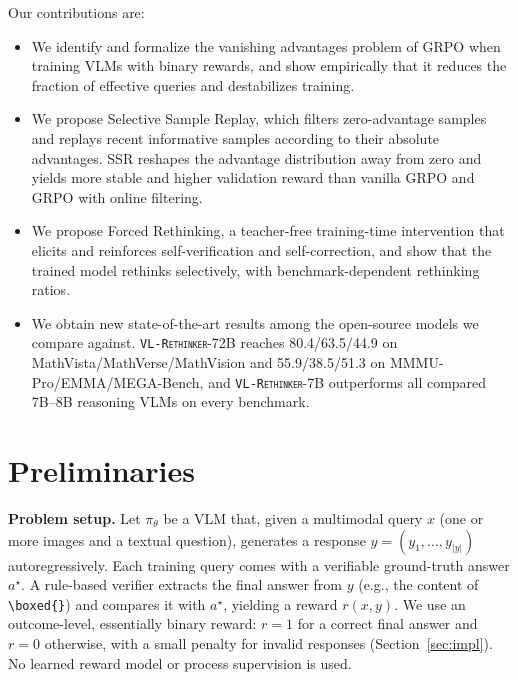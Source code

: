 \documentclass{article}
\newcommand{\model}{\texttt{\textsc{VL-Rethinker}}\xspace}
\begin{document}
Our contributions are:
\begin{itemize}[leftmargin=*,itemsep=1pt,topsep=2pt]
    \item We identify and formalize the vanishing advantages problem of GRPO when training VLMs with binary rewards, and show empirically that it reduces the fraction of effective queries and destabilizes training.
    \item We propose Selective Sample Replay, which filters zero-advantage samples and replays recent informative samples according to their absolute advantages. SSR reshapes the advantage distribution away from zero and yields more stable and higher validation reward than vanilla GRPO and GRPO with online filtering.
    \item We propose Forced Rethinking, a teacher-free training-time intervention that elicits and reinforces self-verification and self-correction, and show that the trained model rethinks selectively, with benchmark-dependent rethinking ratios.
    \item We obtain new state-of-the-art results among the open-source models we compare against. \model-72B reaches 80.4/63.5/44.9 on MathVista/MathVerse/MathVision and 55.9/38.5/51.3 on MMMU-Pro/EMMA/MEGA-Bench, and \model-7B outperforms all compared 7B--8B reasoning VLMs on every benchmark.
\end{itemize}

\section{Preliminaries}
\label{sec:prelim}

\textbf{Problem setup.} Let $\pi_\theta$ be a VLM that, given a multimodal query $x$ (one or more images and a textual question), generates a response $y=(y_1,\dots,y_{|y|})$ autoregressively. Each training query comes with a verifiable ground-truth answer $a^\star$. A rule-based verifier extracts the final answer from $y$ (e.g., the content of \texttt{\textbackslash boxed\{\}}) and compares it with $a^\star$, yielding a reward $r(x,y)$. We use an outcome-level, essentially binary reward: $r=1$ for a correct final answer and $r=0$ otherwise, with a small penalty for invalid responses (Section~\ref{sec:impl}). No learned reward model or process supervision is used.
\end{document}
